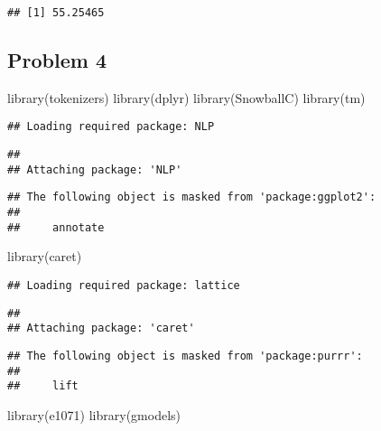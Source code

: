 \documentclass[
]{article}
\newenvironment{Shaded}{\begin{snugshade}}{\end{snugshade}}
\newcommand{\FunctionTok}[1]{\textcolor[rgb]{0.00,0.00,0.00}{#1}}
\newcommand{\NormalTok}[1]{#1}
\begin{document}
\begin{verbatim}
## [1] 55.25465
\end{verbatim}

\hypertarget{problem-4}{%
\subsection{Problem 4}\label{problem-4}}

\begin{Shaded}
\begin{Highlighting}[]
\FunctionTok{library}\NormalTok{(tokenizers)}
\FunctionTok{library}\NormalTok{(dplyr)}
\FunctionTok{library}\NormalTok{(SnowballC)}
\FunctionTok{library}\NormalTok{(tm)}
\end{Highlighting}
\end{Shaded}

\begin{verbatim}
## Loading required package: NLP
\end{verbatim}

\begin{verbatim}
## 
## Attaching package: 'NLP'
\end{verbatim}

\begin{verbatim}
## The following object is masked from 'package:ggplot2':
## 
##     annotate
\end{verbatim}

\begin{Shaded}
\begin{Highlighting}[]
\FunctionTok{library}\NormalTok{(caret)}
\end{Highlighting}
\end{Shaded}

\begin{verbatim}
## Loading required package: lattice
\end{verbatim}

\begin{verbatim}
## 
## Attaching package: 'caret'
\end{verbatim}

\begin{verbatim}
## The following object is masked from 'package:purrr':
## 
##     lift
\end{verbatim}

\begin{Shaded}
\begin{Highlighting}[]
\FunctionTok{library}\NormalTok{(e1071)}
\FunctionTok{library}\NormalTok{(gmodels)}
\end{Highlighting}
\end{Shaded}
\end{document}
